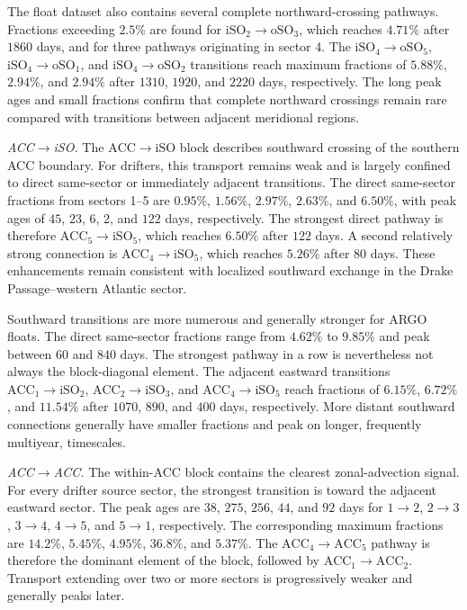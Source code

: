 \documentclass[
  draft
]{agujournal2025}
\begin{document}
                The float dataset also contains several complete northward-crossing pathways. Fractions exceeding $2.5 \%$ are found for $\mathrm{iSO}_2 \rightarrow \mathrm{oSO}_3$, which reaches $4.71 \%$ after $1860$ days, and for three pathways originating in sector 4. The $\mathrm{iSO}_4 \rightarrow \mathrm{oSO}_5$, $\mathrm{iSO}_4 \rightarrow \mathrm{oSO}_1$, and $\mathrm{iSO}_4 \rightarrow \mathrm{oSO}_2$ transitions reach maximum fractions of $5.88 \%$, $2.94 \%$, and $2.94 \%$ after $1310$, $1920$, and $2220$ days, respectively. The long peak ages and small fractions confirm that complete northward crossings remain rare compared with transitions between adjacent meridional regions.
    
                \medskip
                \noindent
                \textit{ACC$\boldsymbol{\rightarrow}$iSO.}
                The $\mathrm{ACC} \rightarrow \mathrm{iSO}$ block describes southward crossing of the southern ACC boundary. For drifters, this transport remains weak and is largely confined to direct same-sector or immediately adjacent transitions. The direct same-sector fractions from sectors 1--5 are $0.95 \%$, $1.56 \%$, $2.97 \%$, $2.63 \%$, and $6.50 \%$, with peak ages of $45$, $23$, $6$, $2$, and $122$ days, respectively. The strongest direct pathway is therefore $\mathrm{ACC}_5 \rightarrow \mathrm{iSO}_5$, which reaches $6.50 \%$ after $122$ days. A second relatively strong connection is $\mathrm{ACC}_4 \rightarrow \mathrm{iSO}_5$, which reaches $5.26 \%$ after $80$ days. These enhancements remain consistent with localized southward exchange in the Drake Passage--western Atlantic sector.
    
                Southward transitions are more numerous and generally stronger for ARGO floats. The direct same-sector fractions range from $4.62 \%$ to $9.85 \%$ and peak between $60$ and $840$ days. The strongest pathway in a row is nevertheless not always the block-diagonal element. The adjacent eastward transitions $\mathrm{ACC}_1 \rightarrow \mathrm{iSO}_2$, $\mathrm{ACC}_2 \rightarrow \mathrm{iSO}_3$, and $\mathrm{ACC}_4 \rightarrow \mathrm{iSO}_5$ reach fractions of $6.15 \%$, $6.72 \%$, and $11.54 \%$ after $1070$, $890$, and $400$ days, respectively. More distant southward connections generally have smaller fractions and peak on longer, frequently multiyear, timescales.
                
                \medskip
                \noindent
                \textit{ACC$\boldsymbol{\rightarrow}$ACC.}
                The within-ACC block contains the clearest zonal-advection signal. For every drifter source sector, the strongest transition is toward the adjacent eastward sector. The peak ages are $38$, $275$, $256$, $44$, and $92$ days for $1\rightarrow2$, $2\rightarrow3$, $3\rightarrow4$, $4\rightarrow5$, and $5\rightarrow1$, respectively. The corresponding maximum fractions are $14.2 \%$, $5.45 \%$, $4.95 \%$, $36.8 \%$, and $5.37 \%$. The $\mathrm{ACC}_4 \rightarrow \mathrm{ACC}_5$ pathway is therefore the dominant element of the block, followed by $\mathrm{ACC}_1 \rightarrow \mathrm{ACC}_2$. Transport extending over two or more sectors is progressively weaker and generally peaks later.
    
\end{document}
